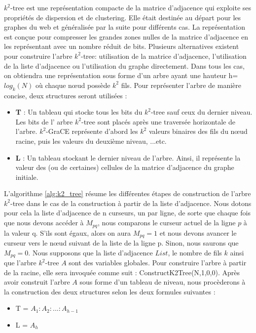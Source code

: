 \documentclass[a4paper,oneside,12pt]{report}
\theoremstyle{definition}
\begin{document}
			$k^2$-tree est une représentation compacte de la matrice d'adjacence qui exploite ses propriétés de dispersion et de clustering. Elle était destinée au départ pour les graphes du web et généralisée par la suite pour différents cas. La représentation est conçue pour compresser les grandes zones nulles de la matrice d'adjacence en les représentant avec un nombre réduit de bits. Plusieurs alternatives existent pour construire l'arbre $k^2$-tree: utilisation de la matrice d'adjacence, l'utilisation de la liste d'adjacence ou l'utilisation du graphe directement. Dans tous les cas, on obtiendra une représentation sous forme d'un arbre ayant une hauteur h= $log_k(N)$ où chaque nœud possède $k^2$ fils. 
			  Pour représenter l'arbre de manière concise, deux structures seront utilisées :
			\begin{itemize}
			\item \textbf{T }: Un tableau qui stocke tous les bits du $k^2$-tree sauf ceux du dernier niveau. Les bits de l' arbre $k^2$-tree sont placés après une traversée horizontale de l'arbre. $k^2$-GraCE représente d'abord les $k^2$ valeurs binaires des fils du nœud racine, puis les valeurs du deuxième niveau, ...etc.
			
			\item  \textbf{L} : Un tableau stockant le dernier niveau de l'arbre. Ainsi, il représente la valeur des (ou de certaines) cellules de la matrice d'adjacence du graphe initiale.
			\end{itemize}
			
			L'algorithme \ref{alg:k2_tree} résume les différentes étapes de construction de l'arbre $k^2$-tree dans le cas de la construction à partir de la liste d'adjacence. Nous dotons pour cela la liste d'adjacence de n curseurs, un par ligne, de sorte que chaque fois que nous devons accéder à $M_{pq}$, nous comparons le curseur actuel de la ligne $p$ à la valeur q. S'ils sont égaux, alors on aura $M_{pq} = 1$ et nous devons avancer le curseur vers le nœud suivant de la liste de la ligne p. Sinon, nous saurons que $M_{pq} = 0$. Nous supposons que la liste d'adjacence $List$, le nombre de fils $k$ ainsi que l'arbre $k^2$-tree $A$ sont des variables globales. Pour construire l'arbre à partir de la racine, elle sera invoquée comme suit :  ConstructK2Tree(N,1,0,0). Après avoir construit l'arbre $A$ sous forme d'un tableau de niveau, nous procèderons à la construction des deux structures selon les deux formules suivantes :
			\begin{itemize}[label=$\bullet$]
			 	\item T = $A_1: A_2:. . . :A_{h-1}$
			 	\item L = $A_h$
			\end{itemize}	
\end{document}
